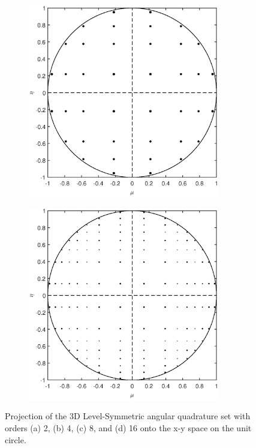 \begin{figure}
\begin{subfigure}[b]{0.48\textwidth}
		\caption{}
	\end{subfigure}
	\vfill
	\begin{subfigure}[b]{0.48\textwidth}
		\centering
		\includegraphics[width=0.92\textwidth]{figures/sec_Sn/LS8_2D.eps}
		\caption{}
	\end{subfigure}
	\hfill
	\begin{subfigure}[b]{0.48\textwidth}
		\centering
		\includegraphics[width=0.92\textwidth]{figures/sec_Sn/LS16_2D.eps}
		\caption{}
	\end{subfigure}
\caption{Projection of the 3D Level-Symmetric angular quadrature set with orders (a) 2, (b) 4, (c) 8, and (d) 16 onto the x-y space on the unit circle.}
\label{fig::Sn_Angle_LS_Quads_2D}
\end{figure}

